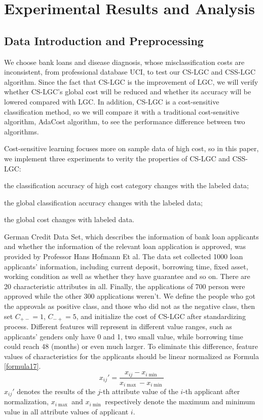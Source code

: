\documentclass{svjour3}                     %
\begin{document}
\section{Experimental Results and Analysis}
\subsection{Data Introduction and Preprocessing}\label{sec:preexp}
We choose bank loans and disease diagnosis, whose misclassification costs are inconsistent, from professional database UCI\cite{Lichman:2013}, to
test our CS-LGC and CSS-LGC algorithm. Since the fact that CS-LGC is the improvement of LGC, we will verify whether CS-LGC’s global cost will be reduced and whether its accuracy will be lowered compared with LGC. In addition, CS-LGC is a cost-sensitive classification method, so we will compare it with a traditional cost-sensitive algorithm, AdaCost algorithm, to see the performance difference between two algorithms.

Cost-sensitive learning focuses more on sample data of high cost, so in this paper, we implement three experiments to verity the properties of CS-LGC and CSS-LGC:
\begin{inparaenum}[(1)]
  \item the classification accuracy of high cost category changes with the labeled data;
  \item the global classification accuracy changes with the labeled data;
  \item the global cost changes with labeled data.
\end{inparaenum}

German Credit Data Set\cite{germandata}, which describes the information of bank loan applicants and whether the information of the relevant loan application is approved, was provided by Professor Hans Hofmann Et al. The data set collected 1000 loan applicants' information, including current deposit, borrowing time, fixed asset, working condition as well as whether they have guarantee and so on. There are 20 characteristic attributes in all. Finally, the applications of 700 person were approved while the other 300 applications weren't. We define the people who got the approvals as positive class, and those who did not as the negative class, then set ${C_{ +  - }} = 1$, ${C_{ -  + }} = 5$, and initialize the cost of CS-LGC after standardizing process. Different features will represent in different value ranges, such as applicants' genders only have 0 and 1, two small value, while borrowing time could reach 48 (months) or even much larger. To eliminate this difference, feature values  of characteristics for the applicants should be linear normalized as Formula \ref{formula17}.
\begin{equation} \label{formula17}
  {x_{ij}}' = \frac{{{x_{ij}} - {x_{i\min }}}}{{{x_{i\max }} - {x_{i\min }}}}
\end{equation}
${x_{ij}}'$ denotes the results of the $j$-th attribute value of the $i$-th applicant after normalization, ${{x_{i\max }}}$ and ${{x_{i\min }}}$ respectively denote the maximum and minimum value in all attribute values of applicant $i$.
\end{document}
